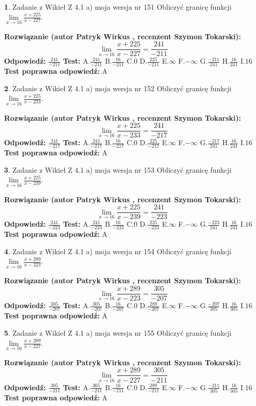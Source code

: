 \documentclass[12pt, a4paper]{article}
\theoremstyle{definition} %
\newtheorem{zad}{}
\newcommand{\zadStart}[1]{\begin{zad}#1\newline}
\newcommand{\zadStop}{\end{zad}}
\newcommand{\rozwStart}[2]{\noindent \textbf{Rozwiązanie (autor #1 , recenzent #2): }\newline}
\newcommand{\rozwStop}{\newline}
\newcommand{\odpStart}{\noindent \textbf{Odpowiedź:}\newline}
\newcommand{\odpStop}{\newline}
\newcommand{\testStart}{\noindent \textbf{Test:}\newline}
\newcommand{\testStop}{\newline}
\newcommand{\kluczStart}{\noindent \textbf{Test poprawna odpowiedź:}\newline}
\newcommand{\kluczStop}{\newline}
\begin{document}
\zadStart{Zadanie z Wikieł Z 4.1 a) moja wersja nr 151}
Obliczyć granicę funkcji $\lim\limits_{x\to16}\frac{x+225}{x-227}$.
\zadStop
\rozwStart{Patryk Wirkus}{Szymon Tokarski}
$$\lim\limits_{x\to16}\frac{x+225}{x-227} = \frac{241}{-211}$$
\rozwStop
\odpStart
$\frac{241}{-211}$
\odpStop
\testStart
A.$\frac{241}{-211}$
B.$\frac{16}{-211}$
C.$0$
D.$\frac{225}{-211}$
E.$\infty$
F.$-\infty$
G.$\frac{-211}{241}$
H.$\frac{16}{241}$
I.$16$
\testStop
\kluczStart
A
\kluczStop



\zadStart{Zadanie z Wikieł Z 4.1 a) moja wersja nr 152}
Obliczyć granicę funkcji $\lim\limits_{x\to16}\frac{x+225}{x-233}$.
\zadStop
\rozwStart{Patryk Wirkus}{Szymon Tokarski}
$$\lim\limits_{x\to16}\frac{x+225}{x-233} = \frac{241}{-217}$$
\rozwStop
\odpStart
$\frac{241}{-217}$
\odpStop
\testStart
A.$\frac{241}{-217}$
B.$\frac{16}{-217}$
C.$0$
D.$\frac{225}{-217}$
E.$\infty$
F.$-\infty$
G.$\frac{-217}{241}$
H.$\frac{16}{241}$
I.$16$
\testStop
\kluczStart
A
\kluczStop



\zadStart{Zadanie z Wikieł Z 4.1 a) moja wersja nr 153}
Obliczyć granicę funkcji $\lim\limits_{x\to16}\frac{x+225}{x-239}$.
\zadStop
\rozwStart{Patryk Wirkus}{Szymon Tokarski}
$$\lim\limits_{x\to16}\frac{x+225}{x-239} = \frac{241}{-223}$$
\rozwStop
\odpStart
$\frac{241}{-223}$
\odpStop
\testStart
A.$\frac{241}{-223}$
B.$\frac{16}{-223}$
C.$0$
D.$\frac{225}{-223}$
E.$\infty$
F.$-\infty$
G.$\frac{-223}{241}$
H.$\frac{16}{241}$
I.$16$
\testStop
\kluczStart
A
\kluczStop



\zadStart{Zadanie z Wikieł Z 4.1 a) moja wersja nr 154}
Obliczyć granicę funkcji $\lim\limits_{x\to16}\frac{x+289}{x-223}$.
\zadStop
\rozwStart{Patryk Wirkus}{Szymon Tokarski}
$$\lim\limits_{x\to16}\frac{x+289}{x-223} = \frac{305}{-207}$$
\rozwStop
\odpStart
$\frac{305}{-207}$
\odpStop
\testStart
A.$\frac{305}{-207}$
B.$\frac{16}{-207}$
C.$0$
D.$\frac{289}{-207}$
E.$\infty$
F.$-\infty$
G.$\frac{-207}{305}$
H.$\frac{16}{305}$
I.$16$
\testStop
\kluczStart
A
\kluczStop



\zadStart{Zadanie z Wikieł Z 4.1 a) moja wersja nr 155}
Obliczyć granicę funkcji $\lim\limits_{x\to16}\frac{x+289}{x-227}$.
\zadStop
\rozwStart{Patryk Wirkus}{Szymon Tokarski}
$$\lim\limits_{x\to16}\frac{x+289}{x-227} = \frac{305}{-211}$$
\rozwStop
\odpStart
$\frac{305}{-211}$
\odpStop
\testStart
A.$\frac{305}{-211}$
B.$\frac{16}{-211}$
C.$0$
D.$\frac{289}{-211}$
E.$\infty$
F.$-\infty$
G.$\frac{-211}{305}$
H.$\frac{16}{305}$
I.$16$
\testStop
\kluczStart
A
\kluczStop
\end{document}
